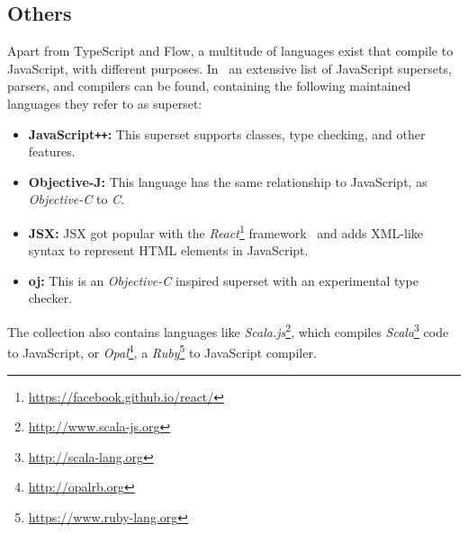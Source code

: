 \subsection{Others}
\label{sec:other-supersets}

%


Apart from TypeScript and Flow, a multitude of languages exist that compile to JavaScript, with different purposes. In~\cite{LanguagesThatCompileToJS:CoffeeScript} an extensive list of JavaScript supersets, parsers, and compilers can be found, containing the following maintained languages they refer to as superset:
\begin{itemize}
  \item \textbf{JavaScript\texttt{++}:} This superset supports classes, type checking, and other features.
  \item \textbf{Objective-J:} This language has the same relationship to JavaScript, as \emph{Objective-C} to \emph{C}.
  \item \textbf{JSX:} JSX got popular with the \emph{React}\footnote{\url{https://facebook.github.io/react/}} framework~\cite{TypeScriptHandbook:JSX} and adds XML-like syntax to represent HTML elements in JavaScript.
  \item \textbf{oj:} This is an \emph{Objective-C} inspired superset with an experimental type checker.
\end{itemize}
The collection also contains languages like \emph{Scala.js}\footnote{\url{http://www.scala-js.org}}, which compiles \emph{Scala}\footnote{\url{http://scala-lang.org}} code to JavaScript, or \emph{Opal}\footnote{\url{http://opalrb.org}}, a \emph{Ruby}\footnote{\url{https://www.ruby-lang.org}} to JavaScript compiler.

